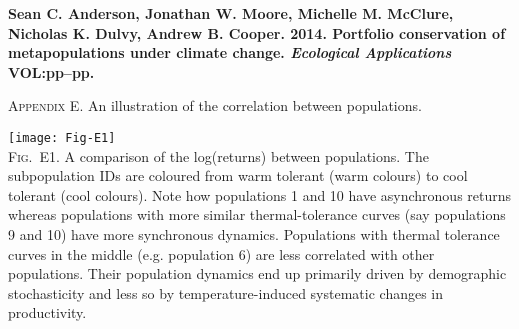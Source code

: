 \documentclass[12pt]{article}
\begin{document}
\textbf{Sean C. Anderson, Jonathan W. Moore, Michelle M. McClure, Nicholas K. Dulvy, Andrew B. Cooper. 2014. Portfolio conservation of metapopulations under climate change. \textit{Ecological Applications} VOL:pp--pp.}

\bigskip

\textsc{Appendix E.} An illustration of the correlation between populations.

\bigskip

\texttt{[image: Fig-E1]}\\
\textsc{Fig.~E1.} A comparison of the log(returns) between populations. The subpopulation IDs are coloured from warm tolerant (warm colours) to cool tolerant (cool colours). Note how populations 1 and 10 have asynchronous returns whereas populations with more similar thermal-tolerance curves (say populations 9 and 10) have more synchronous dynamics. Populations with thermal tolerance curves in the middle (e.g. population 6) are less correlated with other populations. Their population dynamics end up primarily driven by demographic stochasticity and less so by temperature-induced systematic changes in productivity.
\end{document}
